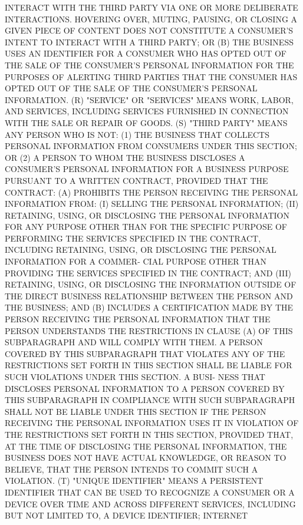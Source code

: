  INTERACT  WITH  THE THIRD PARTY VIA ONE OR MORE DELIBERATE INTERACTIONS.
 HOVERING OVER, MUTING, PAUSING, OR CLOSING A GIVEN PIECE OF CONTENT DOES
 NOT CONSTITUTE A CONSUMER'S INTENT TO INTERACT WITH A THIRD PARTY; OR
   (B)  THE  BUSINESS USES AN IDENTIFIER FOR A CONSUMER WHO HAS OPTED OUT
 OF THE SALE OF THE CONSUMER'S PERSONAL INFORMATION FOR THE  PURPOSES  OF
 ALERTING  THIRD  PARTIES  THAT THE CONSUMER HAS OPTED OUT OF THE SALE OF
 THE CONSUMER'S PERSONAL INFORMATION.
   (R) "SERVICE" OR "SERVICES" MEANS WORK, LABOR, AND SERVICES, INCLUDING
 SERVICES FURNISHED IN CONNECTION WITH THE SALE OR REPAIR OF GOODS.
   (S) "THIRD PARTY" MEANS ANY PERSON WHO IS NOT:
   (1) THE BUSINESS THAT COLLECTS  PERSONAL  INFORMATION  FROM  CONSUMERS
 UNDER THIS SECTION; OR
   (2)  A  PERSON  TO  WHOM  THE BUSINESS DISCLOSES A CONSUMER'S PERSONAL
 INFORMATION FOR A BUSINESS  PURPOSE  PURSUANT  TO  A  WRITTEN  CONTRACT,
 PROVIDED THAT THE CONTRACT:
   (A)  PROHIBITS THE PERSON RECEIVING THE PERSONAL INFORMATION FROM: (I)
 SELLING THE PERSONAL INFORMATION; (II) RETAINING, USING,  OR  DISCLOSING
 THE  PERSONAL  INFORMATION  FOR  ANY PURPOSE OTHER THAN FOR THE SPECIFIC
 PURPOSE OF PERFORMING THE SERVICES SPECIFIED IN THE CONTRACT,  INCLUDING
 RETAINING,  USING,  OR DISCLOSING THE PERSONAL INFORMATION FOR A COMMER-
 CIAL  PURPOSE  OTHER  THAN  PROVIDING  THE  SERVICES  SPECIFIED  IN  THE
 CONTRACT;  AND  (III)  RETAINING,  USING,  OR DISCLOSING THE INFORMATION
 OUTSIDE OF THE DIRECT BUSINESS RELATIONSHIP BETWEEN THE PERSON  AND  THE
 BUSINESS; AND
   (B) INCLUDES A CERTIFICATION MADE BY THE PERSON RECEIVING THE PERSONAL
 INFORMATION  THAT  THE PERSON UNDERSTANDS THE RESTRICTIONS IN CLAUSE (A)
 OF THIS SUBPARAGRAPH AND WILL COMPLY WITH THEM. A PERSON COVERED BY THIS
 SUBPARAGRAPH THAT VIOLATES ANY OF THE RESTRICTIONS  SET  FORTH  IN  THIS
 SECTION  SHALL BE LIABLE FOR SUCH VIOLATIONS UNDER THIS SECTION. A BUSI-
 NESS THAT DISCLOSES PERSONAL INFORMATION TO A  PERSON  COVERED  BY  THIS
 SUBPARAGRAPH  IN  COMPLIANCE  WITH SUCH SUBPARAGRAPH SHALL NOT BE LIABLE
 UNDER THIS SECTION IF THE PERSON RECEIVING THE PERSONAL INFORMATION USES
 IT IN VIOLATION OF THE RESTRICTIONS SET FORTH IN THIS SECTION,  PROVIDED
 THAT,  AT  THE TIME OF DISCLOSING THE PERSONAL INFORMATION, THE BUSINESS
 DOES NOT HAVE ACTUAL KNOWLEDGE, OR REASON TO BELIEVE,  THAT  THE  PERSON
 INTENDS TO COMMIT SUCH A VIOLATION.
   (T) "UNIQUE IDENTIFIER" MEANS A PERSISTENT IDENTIFIER THAT CAN BE USED
 TO  RECOGNIZE  A  CONSUMER  OR  A  DEVICE OVER TIME AND ACROSS DIFFERENT
 SERVICES, INCLUDING BUT NOT LIMITED TO, A  DEVICE  IDENTIFIER;  INTERNET

